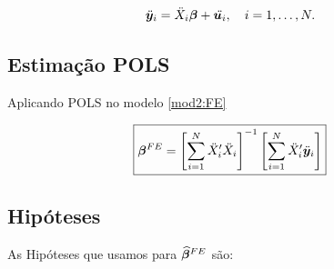 \documentclass[11pt,oneside,a4paper]{article}
\numberwithin{equation}{section}
\begin{document}
\vspace{-1 em}
\begin{align} \label{mod2:FE}
\ddot{\boldsymbol{y}}_{i} &= \ddot{X}_{i} \boldsymbol{\beta} + \ddot{\boldsymbol{u}_{i}},
\quad i = 1, \dots, N.
\end{align}

\subsection*{Estimação POLS}

Aplicando POLS no modelo \eqref{mod2:FE}

\vspace{-1 em}
\begin{align} \label{beta:pols:FE}
\Aboxed{
\mbs{\beta}^{FE} =
\left[ \sum_{i=1}^{N} \ddot{X}_{i}' \ddot{X}_{i} \right]^{-1}
\left[ \sum_{i=1}^{N} \ddot{X}_{i}' \ddot{\mbs{y}}_{i} \right]
}
\end{align}

\subsection*{Hipóteses}

As Hipóteses que usamos para $\boldsymbol{\widehat{\beta}}^{FE}$ são:
\end{document}
